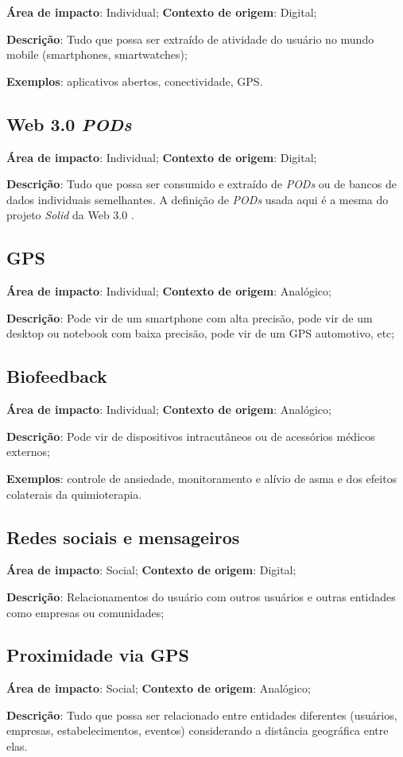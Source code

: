\textbf{Área de impacto}: Individual; \textbf{Contexto de origem}: Digital;

\textbf{Descrição}: Tudo que possa ser extraído de atividade do usuário no mundo mobile (smartphones, smartwatches);

\textbf{Exemplos}: aplicativos abertos, conectividade, GPS.

\subsection{Web 3.0 \textit{PODs}}

\textbf{Área de impacto}: Individual; \textbf{Contexto de origem}: Digital;

\textbf{Descrição}: Tudo que possa ser consumido e extraído de \textit{PODs} ou de bancos de dados individuais semelhantes. A definição de \textit{PODs} usada aqui é a mesma do projeto \textit{Solid} da Web 3.0 \cite{solid}.

\subsection{GPS}

\textbf{Área de impacto}: Individual; \textbf{Contexto de origem}: Analógico;

\textbf{Descrição}: Pode vir de um smartphone com alta precisão, pode vir de um desktop ou notebook com baixa precisão, pode vir de um GPS automotivo, etc;

\subsection{Biofeedback}

\textbf{Área de impacto}: Individual; \textbf{Contexto de origem}: Analógico;

\textbf{Descrição}: Pode vir de dispositivos intracutâneos ou de acessórios médicos externos;

\textbf{Exemplos}: controle de ansiedade, monitoramento e alívio de asma e dos efeitos colaterais da quimioterapia.

\subsection{Redes sociais e mensageiros}

\textbf{Área de impacto}: Social; \textbf{Contexto de origem}: Digital;

\textbf{Descrição}: Relacionamentos do usuário com outros usuários e outras entidades como empresas ou comunidades;

\subsection{Proximidade via GPS}

\textbf{Área de impacto}: Social; \textbf{Contexto de origem}: Analógico;

\textbf{Descrição}: Tudo que possa ser relacionado entre entidades diferentes (usuários, empresas, estabelecimentos, eventos) considerando a distância geográfica entre elas.